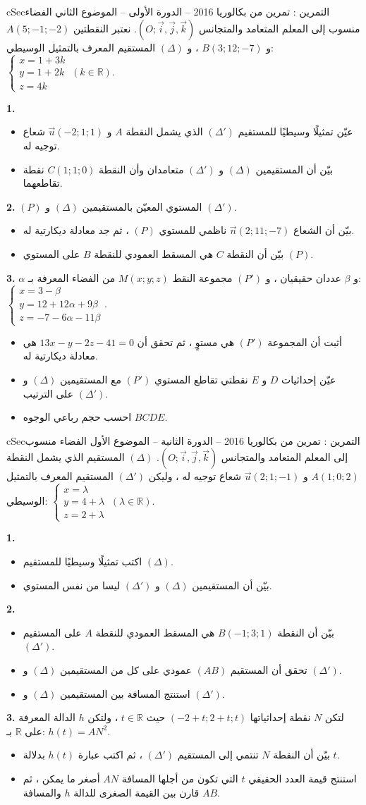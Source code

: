 \documentclass[12pt,a4paper]{article}
\newenvironment{BOX}[2]{\begin{otherlanguage}{english}\begin{arbox}{#1}{#2}}{\end{arbox}\end{otherlanguage}}
\newcounter{exo}
\newenvironment{tamrin}[1]{\stepcounter{exo}\begin{BOX}{cSec}{التمرين \theexo: #1}}{\end{BOX}}
\newcommand{\R}{\mathbb{R}}
\newenvironment{sq}{\begin{itemize}[leftmargin=2.4em,itemsep=3pt]}{\end{itemize}}
\newcommand{\qa}{\item[(أ)]}\newcommand{\qb}{\item[(ب)]}\newcommand{\qc}{\item[(جـ)]}\newcommand{\qd}{\item[(د)]}\newcommand{\qe}{\item[(هـ)]}
\newcommand{\QQ}[1]{\par\smallskip\textbf{#1.} }
\newcommand{\Rep}{(O;\vec i,\vec j,\vec k)}
\newcommand{\Sys}[1]{\left\{\begin{array}{l}#1\end{array}\right.}
\begin{document}
\begin{tamrin}{تمرين من بكالوريا 2016 -- الدورة الأولى -- الموضوع الثاني}
الفضاء منسوب إلى المعلم المتعامد والمتجانس $\Rep$. نعتبر النقطتين $A(5;-1;-2)$ و $B(3;12;-7)$ ، و $(\Delta)$ المستقيم المعرف بالتمثيل الوسيطي: $\Sys{x=1+3k\\y=1+2k\\z=4k}\ (k\in\R)$.
\QQ{1}
\begin{sq}
\qa عيّن تمثيلًا وسيطيًا للمستقيم $(\Delta')$ الذي يشمل النقطة $A$ و $\vec u(-2;1;1)$ شعاع توجيه له.
\qb بيّن أن المستقيمين $(\Delta)$ و $(\Delta')$ متعامدان وأن النقطة $C(1;1;0)$ نقطة تقاطعهما.
\end{sq}
\QQ{2} $(P)$ المستوي المعيّن بالمستقيمين $(\Delta)$ و $(\Delta')$.
\begin{sq}
\qa بيّن أن الشعاع $\vec n(2;11;-7)$ ناظمي للمستوي $(P)$ ، ثم جد معادلة ديكارتية له.
\qb بيّن أن النقطة $C$ هي المسقط العمودي للنقطة $B$ على المستوي $(P)$.
\end{sq}
\QQ{3} $\alpha$ و $\beta$ عددان حقيقيان ، و $(P')$ مجموعة النقط $M(x;y;z)$ من الفضاء المعرفة بـ: $\Sys{x=3-\beta\\y=12+12\alpha+9\beta\\z=-7-6\alpha-11\beta}$.
\begin{sq}
\qa أثبت أن المجموعة $(P')$ هي مستوٍ ، ثم تحقق أن $13x-y-2z-41=0$ هي معادلة ديكارتية له.
\qb عيّن إحداثيات $D$ و $E$ نقطتي تقاطع المستوي $(P')$ مع المستقيمين $(\Delta)$ و $(\Delta')$ على الترتيب.
\qc احسب حجم رباعي الوجوه $BCDE$.
\end{sq}
\end{tamrin}
\begin{tamrin}{تمرين من بكالوريا 2016 -- الدورة الثانية -- الموضوع الأول}
الفضاء منسوب إلى المعلم المتعامد والمتجانس $\Rep$. $(\Delta)$ المستقيم الذي يشمل النقطة $A(1;0;2)$ و $\vec u(2;1;-1)$ شعاع توجيه له ، وليكن $(\Delta')$ المستقيم المعرف بالتمثيل الوسيطي: $\Sys{x=\lambda\\y=4+\lambda\\z=2+\lambda}\ (\lambda\in\R)$.
\QQ{1}
\begin{sq}
\qa اكتب تمثيلًا وسيطيًا للمستقيم $(\Delta)$.
\qb بيّن أن المستقيمين $(\Delta)$ و $(\Delta')$ ليسا من نفس المستوي.
\end{sq}
\QQ{2}
\begin{sq}
\qa بيّن أن النقطة $B(-1;3;1)$ هي المسقط العمودي للنقطة $A$ على المستقيم $(\Delta')$.
\qb تحقق أن المستقيم $(AB)$ عمودي على كل من المستقيمين $(\Delta)$ و $(\Delta')$.
\qc استنتج المسافة بين المستقيمين $(\Delta)$ و $(\Delta')$.
\end{sq}
\QQ{3} لتكن $N$ نقطة إحداثياتها $(-2+t;2+t;t)$ حيث $t\in\R$ ، ولتكن $h$ الدالة المعرفة على $\R$ بـ: $h(t)=AN^2$.
\begin{sq}
\qa بيّن أن النقطة $N$ تنتمي إلى المستقيم $(\Delta')$ ، ثم اكتب عبارة $h(t)$ بدلالة $t$.
\qb استنتج قيمة العدد الحقيقي $t$ التي تكون من أجلها المسافة $AN$ أصغر ما يمكن ، ثم قارن بين القيمة الصغرى للدالة $h$ والمسافة $AB$.
\end{sq}
\end{tamrin}
\end{document}
